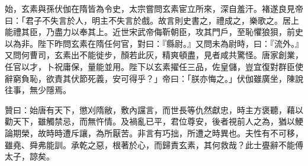 \begin{pinyinscope}
 始，玄素與孫伏伽在隋皆為令史，太宗嘗問玄素宦立所來，深自羞汗。褚遂良見帝曰：「君子不失言於人，明主不失言於戲。故言則史書之，禮成之，樂歌之。居上能禮其臣，乃盡力以奉其上。近世宋武帝侮靳朝臣，攻其門戶，至恥懼狼狽，前史以為非。陛下昨問玄素在隋任何官，對曰：『縣尉。』又問未為尉時，曰：『流外。』又問何曹司，玄素出不能徙步，顏若此灰，精爽頓盡，見者咸共驚怪。唐家創業，任官以才，卜祝庸保，量能並用。陛下以玄素擢任三品，佐皇儲，豈宜復對群臣使辭窮負恥，欲責其伏節死義，安可得乎？」帝曰：「朕亦悔之。」伏伽雖廣坐，陳說往事，無少隱焉。



 贊曰：始唐有天下，懲刈隋敝，敷內讜言，而世長等仇然獻忠，時主方褒聽，藉以勸天下，雖觸禁忌，而無忤情。及禍亂已平，君位尊安，後者視前人之為，猶以鯁論期榮，故時時遭斥讓，為所厭苦。非言有巧拙，所遭之時異也。夫性有不可移，雖堯、舜弗能訓。承乾之惡，根著於心，而歸責玄素，其何救哉？此士亹辭不能傅太子，諒矣。



\end{pinyinscope}